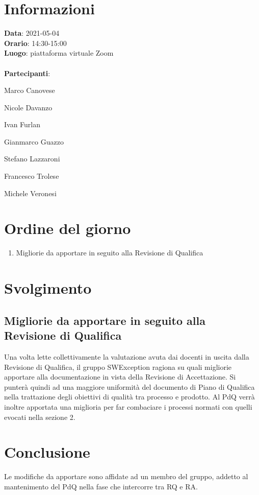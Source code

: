 \section{Informazioni}
\textbf{Data}: 2021-05-04 \\
\textbf{Orario}: 14:30-15:00 \\
\textbf{Luogo}: piattaforma virtuale Zoom \\\\
\textbf{Partecipanti}:\begin{list}{*}{\setlength{\itemsep}{0cm}}
	\item Marco Canovese
	\item Nicole Davanzo
	\item Ivan Furlan
	\item Gianmarco Guazzo
	\item Stefano Lazzaroni
	\item Francesco Trolese
	\item Michele Veronesi
\end{list}

\section{Ordine del giorno}
\begin{enumerate}
	\item Migliorie da apportare in seguito alla Revisione di Qualifica
\end{enumerate}

\section{Svolgimento}
\subsection{Migliorie da apportare in seguito alla Revisione di Qualifica}
Una volta lette collettivamente la valutazione avuta dai docenti in uscita dalla Revisione di Qualifica, il gruppo SWException
ragiona su quali migliorie apportare alla documentazione in vista della Revisione di Accettazione.
Si punterà quindi ad una maggiore uniformità del documento di Piano di Qualifica nella trattazione degli obiettivi di qualità tra processo e prodotto.
Al PdQ verrà inoltre apportata una miglioria per far combaciare i processi normati con quelli evocati nella sezione 2.

\section{Conclusione}
Le modifiche da apportare sono affidate ad un membro del gruppo, addetto al mantenimento del PdQ nella fase che intercorre tra RQ e RA.
